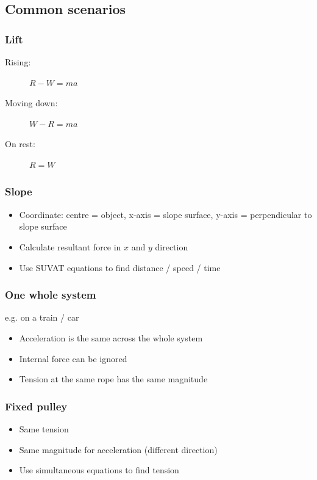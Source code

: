 \documentclass[A4paper]{article}
\begin{document}
	\subsection{Common scenarios}
	\subsubsection{Lift}
	\begin{description}
		\item[Rising: ] $R-W=ma$
		\item[Moving down: ] $W-R=ma$
		\item[On rest: ] $R=W$
	\end{description}
	
	\subsubsection{Slope}
	\begin{itemize}
		\item Coordinate: centre = object, x-axis = slope surface, y-axis = perpendicular to slope surface
		\item Calculate resultant force in $x$ and $y$ direction
		\item Use SUVAT equations to find distance / speed / time
	\end{itemize}
	
	\subsubsection{One whole system}
	e.g. on a train / car
	\begin{itemize}
		\item Acceleration is the same across the whole system
		\item Internal force can be ignored
		\item Tension at the same rope has the same magnitude
	\end{itemize}
	
	\subsubsection{Fixed pulley}
	\begin{itemize}
		\item Same tension
		\item Same magnitude for acceleration (different direction)
		\item Use simultaneous equations to find tension
	\end{itemize}
	
\end{document}
